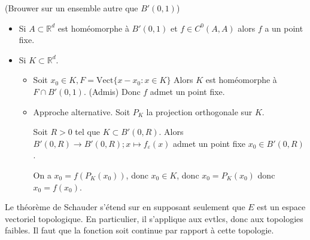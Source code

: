 \begin{remarque}
	(Brouwer sur un ensemble autre que $B'\left( 0,1 \right) $)

	\begin{itemize}
		\item  Si $A \subset \mathbb{R}^d $ est homéomorphe à $B'\left( 0,1 \right) $ et $f \in C^0\left( A,A \right) $ alors $f$ a un point fixe.
		\item Si $K \subset \mathbb{R}^d $.
			\begin{itemize}
				\item Soit $x_0 \in K, F = \text{Vect}\{x-x_0 : x \in K\} $
					Alors $K$ est homéomorphe à $F \cap B'\left( 0,1 \right) .$ (Admis)
					Donc $f$ admet un point fixe.
				\item Approche alternative. Soit $P_K$ la projection orthogonale sur $K$.

					Soit $R>0$ tel que $ K \subset B'\left( 0,R \right) .$ Alors $B'\left( 0,R \right) \to  B'\left( 0,R \right) ; x\mapsto f_{\varepsilon}\left( x \right) $ admet un point fixe $x_0 \in B'\left( 0,R \right) $ .

					On a $x_0 = f\left( P_K\left( x_0 \right)  \right) $, donc $x_0 \in K$, donc $x_0 = P_K\left( x_0 \right) $ donc $x_0 = f\left( x_0 \right) $.
			\end{itemize}
	\end{itemize}
\end{remarque}
\begin{remarque}
	Le théorème de Schauder s'étend sur en supposant seulement que $E$ est un espace vectoriel topologique. En particulier, il s'applique aux evtlcs, donc aux topologies faibles.  {\selectfont{}\relax} Il faut que la fonction soit continue par rapport à cette topologie.
\end{remarque}
	
